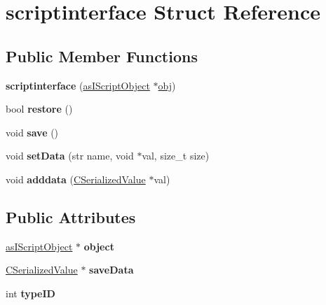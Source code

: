 \hypertarget{structscriptinterface}{}\section{scriptinterface Struct Reference}
\label{structscriptinterface}
\subsection*{Public Member Functions}
\begin{DoxyCompactItemize}
\item 
\mbox{\label{structscriptinterface_a339e5caa72f5f4f61046d679e369e92c}} 
{\bfseries scriptinterface} (\hyperlink{classas_i_script_object}{as\+I\+Script\+Object} $\ast$\hyperlink{structobj}{obj})
\item 
\mbox{\label{structscriptinterface_ad9028e8607d63c0e59e6dfda8c6fd7af}} 
bool {\bfseries restore} ()
\item 
\mbox{\label{structscriptinterface_a08f5ccd266fc04c34d77ca8084d6a0ff}} 
void {\bfseries save} ()
\item 
\mbox{\label{structscriptinterface_af0d12e70d65c69cc6ac7655704189f95}} 
void {\bfseries set\+Data} (str name, void $\ast$val, size\+\_\+t size)
\item 
\mbox{\label{structscriptinterface_aa3d7039d2ca67fb421c653d9b3880f7e}} 
void {\bfseries adddata} (\hyperlink{class_c_serialized_value}{C\+Serialized\+Value} $\ast$val)
\end{DoxyCompactItemize}
\subsection*{Public Attributes}
\begin{DoxyCompactItemize}
\item 
\mbox{\label{structscriptinterface_a10cf2b07b2f57e66c1e03fdc63c9382e}} 
\hyperlink{classas_i_script_object}{as\+I\+Script\+Object} $\ast$ {\bfseries object}
\item 
\mbox{\label{structscriptinterface_ae31af9f6abb952ef40f1c5870d9fe084}} 
\hyperlink{class_c_serialized_value}{C\+Serialized\+Value} $\ast$ {\bfseries save\+Data}
\item 
\mbox{\label{structscriptinterface_aa1a6819b866118532205a32f9d0922c6}} 
int {\bfseries type\+ID}
\end{DoxyCompactItemize}


